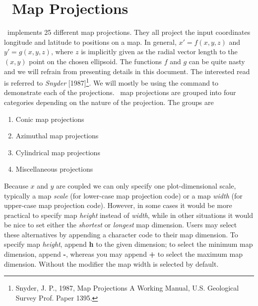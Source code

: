 %
%
\chapter{\gmt\ Map Projections}
\label{ch:6}

\GMT\ implements 25 different map projections.  They all project the input coordinates
longitude and latitude to positions on a map.  In general, $x' = f(x,y,z)$ and $y' = g(x,y,z)$, where
$z$ is implicitly given as the radial vector length to the $(x,y)$ point on the chosen ellipsoid.  The functions $f$ and $g$ can be
quite nasty and we will refrain from presenting details in this document.  The interested read is referred to
{\it Snyder} [1987]\footnote{Snyder, J. P., 1987, Map Projections \- A Working Manual, U.S. Geological Survey Prof. Paper 1395.}.
We will mostly be using the  command to demonstrate each of the projections.
\GMT\ map projections are grouped into four categories depending on the
nature of the projection.  The groups are

\begin{enumerate}
\item Conic map projections
\item Azimuthal map projections
\item Cylindrical map projections
\item Miscellaneous projections
\end{enumerate}

Because $x$ and $y$ are coupled we can only specify one plot-dimensional scale, typically
a map \emph{scale} (for lower-case map projection code) or a map \emph{width} (for upper-case
map projection code).  However, in some cases it would be more
practical to specify map \emph{height} instead of \emph{width}, while in other situations it would be nice
to set either the \emph{shortest} or \emph{longest} map dimension.  Users may select
these alternatives by appending a character code to their map dimension.  To specify map \emph{height},
append {\bf h} to the given dimension; to select the minimum map dimension, append {\bf -}, whereas you may
append {\bf +} to select the maximum map dimension.  Without the modifier the map width is
selected by default.






